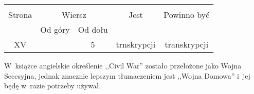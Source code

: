 \documentclass[a4paper,11pt]{article}
\begin{document}
\begin{center}
  \begin{tabular}{|c|c|c|c|c|}
    \hline
    & \multicolumn{2}{c|}{} & & \\
    Strona & \multicolumn{2}{c|}{Wiersz} & Jest
                              & Powinno być \\ \cline{2-3}
    & Od góry & Od dołu & & \\
    \hline
    XV  & &  5 & trnskrypcji & transkrypcji \\
    \hline
  \end{tabular}
\end{center}

\vspace{\spaceTwo}





\newpage
{} %

\vspace{\spaceTwo} \vspace{\spaceThree}






\start W~książce angielskie określenie ,,Civil War'' zostało
przełożone jako Wojna Secesyjna, jednak znacznie lepszym tłumaczeniem
jest ,,Wojna Domowa'' i~jej będę w~razie potrzeby używał.
\end{document}
